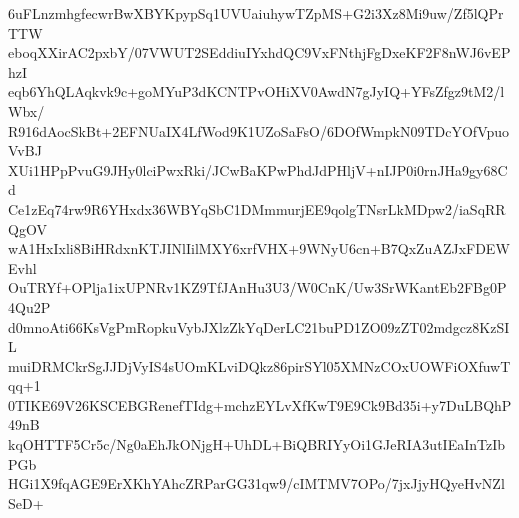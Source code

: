 6uFLnzmhgfecwrBwXBYKpypSq1UVUaiuhywTZpMS+G2i3Xz8Mi9uw/Zf5lQPrTTW
eboqXXirAC2pxbY/07VWUT2SEddiuIYxhdQC9VxFNthjFgDxeKF2F8nWJ6vEPhzI
eqb6YhQLAqkvk9c+goMYuP3dKCNTPvOHiXV0AwdN7gJyIQ+YFsZfgz9tM2/lWbx/
R916dAocSkBt+2EFNUaIX4LfWod9K1UZoSaFsO/6DOfWmpkN09TDcYOfVpuoVvBJ
XUi1HPpPvuG9JHy0lciPwxRki/JCwBaKPwPhdJdPHljV+nIJP0i0rnJHa9gy68Cd
Ce1zEq74rw9R6YHxdx36WBYqSbC1DMmmurjEE9qolgTNsrLkMDpw2/iaSqRRQgOV
wA1HxIxli8BiHRdxnKTJINlIilMXY6xrfVHX+9WNyU6cn+B7QxZuAZJxFDEWEvhl
OuTRYf+OPlja1ixUPNRv1KZ9TfJAnHu3U3/W0CnK/Uw3SrWKantEb2FBg0P4Qu2P
d0mnoAti66KsVgPmRopkuVybJXlzZkYqDerLC21buPD1ZO09zZT02mdgcz8KzSIL
muiDRMCkrSgJJDjVyIS4sUOmKLviDQkz86pirSYl05XMNzCOxUOWFiOXfuwTqq+1
0TIKE69V26KSCEBGRenefTIdg+mchzEYLvXfKwT9E9Ck9Bd35i+y7DuLBQhP49nB
kqOHTTF5Cr5c/Ng0aEhJkONjgH+UhDL+BiQBRIYyOi1GJeRIA3utIEaInTzIbPGb
HGi1X9fqAGE9ErXKhYAhcZRParGG31qw9/cIMTMV7OPo/7jxJjyHQyeHvNZlSeD+
